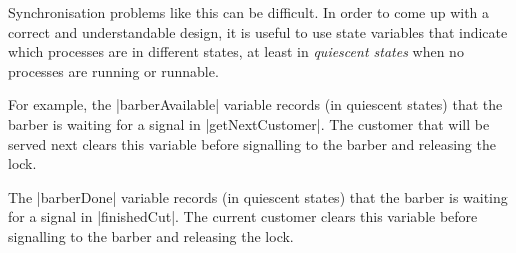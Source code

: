 



\begin{slide}

Synchronisation problems like this can be difficult.  In order to come up with
a correct and understandable design, it is useful to use state variables that
indicate which processes are in different states, at least in \emph{quiescent
  states} when no processes
are running or runnable.

For example, the |barberAvailable| variable records (in quiescent states) that
the barber is waiting for a signal in |getNextCustomer|.  The customer that
will be served next clears this variable before signalling to the barber and
releasing the lock.

The |barberDone| variable records (in quiescent states) that the barber is
waiting for a signal in |finishedCut|.  The current customer clears this
variable before signalling to the barber and releasing the lock.
\end{slide}





